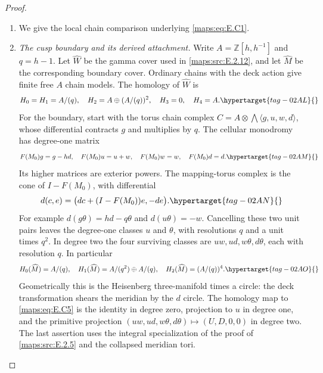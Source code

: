 \documentclass[11pt,a4paper]{article}
\numberwithin{equation}{section}
\theoremstyle{definition}
\begin{document}
\begin{proof}
\begin{enumerate}[label=\arabic*.,leftmargin=*]
\item We give the local chain comparison underlying \eqref{maps:eq:E.C1}.

\item \emph{The cusp boundary and its derived attachment.}
Write $A=\mathbb Z[h,h^{-1}]$ and $q=h-1$. Let
$\widehat W$ be the gamma cover used in \ref{maps:src:E.2.12}, and let
$\widehat M$ be the corresponding boundary cover. Ordinary
chains with the deck action give finite free $A$ chain
models. The homology of $\widehat W$ is
\begin{equation}
 H_0=H_1=A/(q),\quad H_2=A\oplus(A/(q))^2,
 \quad H_3=0,\quad H_4=A.
 \hypertarget{tag-02AL}{}\label{maps:eq:E.C5}
\end{equation}
For the boundary, start with the torus chain complex
$C= A\otimes\bigwedge\langle g,u,w,d\rangle$,
whose differential contracts $g$ and multiplies by $q$.
The cellular monodromy has degree-one matrix
\begin{equation}
 F(M_0)g=g-hd,\quad F(M_0)u=u+w,
 \quad F(M_0)w=w,\quad F(M_0)d=d.
 \hypertarget{tag-02AM}{}\label{maps:eq:E.C6}
\end{equation}
Its higher matrices are exterior powers. The mapping-torus
complex is the cone of $I-F(M_0)$, with differential
\begin{equation}
 d(c,e)=\big(dc+(I-F(M_0))e,-de\big).
 \hypertarget{tag-02AN}{}\label{maps:eq:E.C7}
\end{equation}
For example $d(g\theta)=hd-q\theta$ and
$d(u\theta)=-w$. Cancelling these two unit pairs leaves
the degree-one classes $u$ and $\theta$, with resolutions
$q$ and a unit times $q^2$. In degree two the four surviving
classes are $uw,ud,w\theta,d\theta$, each with resolution
$q$. In particular
\begin{equation}
 H_0(\widehat M)=A/(q),\quad
 H_1(\widehat M)=A/(q^2)\oplus A/(q),\quad
 H_2(\widehat M)=(A/(q))^4.
 \hypertarget{tag-02AO}{}\label{maps:eq:E.C8}
\end{equation}
Geometrically this is the Heisenberg three-manifold times
a circle: the deck transformation shears the meridian
by the $d$ circle. The homology map to \eqref{maps:eq:E.C5} is the
identity in degree zero, projection to $u$ in degree one,
and the primitive projection
$(uw,ud,w\theta,d\theta)\mapsto(U,D,0,0)$ in degree two.
The last assertion uses the integral specialization of the proof of \cref{maps:src:E.2.5} and the collapsed meridian tori.


\end{enumerate}
\end{proof}
\end{document}
